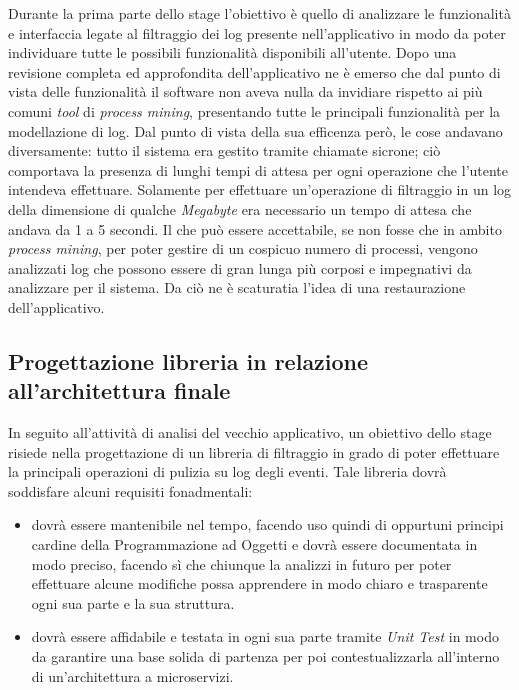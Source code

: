 Durante la prima parte dello stage l'obiettivo è quello di analizzare le funzionalità e interfaccia legate al filtraggio dei log presente nell'applicativo in modo da poter individuare tutte le possibili funzionalità disponibili all'utente. Dopo una revisione completa ed approfondita dell'applicativo ne è emerso che dal punto di vista delle funzionalità il software non aveva nulla da invidiare rispetto ai più comuni \textit{tool} di \textit{process mining}, presentando tutte le principali funzionalità per la modellazione di log. Dal punto di vista della sua efficenza però, le cose andavano diversamente: tutto il sistema era gestito tramite chiamate sicrone; ciò comportava la presenza di lunghi tempi di attesa per ogni operazione che l'utente intendeva effettuare. Solamente per effettuare un'operazione di filtraggio in un log della dimensione di qualche \textit{Megabyte} era necessario un tempo di attesa che andava da 1 a 5 secondi. Il che può essere accettabile, se non fosse che in ambito \textit{process mining}, per poter gestire di un cospicuo numero di processi, vengono analizzati log che possono essere di gran lunga più corposi e impegnativi da analizzare per il sistema. Da ciò ne è scaturatia l'idea di una restaurazione dell'applicativo.
\newpage
\subsection{Progettazione libreria in relazione all'architettura finale}
In seguito all'attività di analisi del vecchio applicativo, un obiettivo dello stage risiede nella progettazione di un libreria di filtraggio in grado di poter effettuare la principali operazioni di pulizia su log degli eventi. Tale libreria dovrà soddisfare alcuni requisiti fonadmentali:
\begin{itemize}
	\item dovrà essere mantenibile nel tempo, facendo uso quindi di oppurtuni principi cardine della Programmazione ad Oggetti e dovrà essere documentata in modo preciso, facendo sì che chiunque la analizzi in futuro per poter effettuare alcune modifiche possa apprendere in modo chiaro e trasparente ogni sua parte e la sua struttura.
	\item dovrà essere affidabile e testata in ogni sua parte tramite \textit{Unit Test} in modo da garantire una base solida di partenza per poi contestualizzarla all'interno di un'architettura a microservizi.
\end{itemize}
